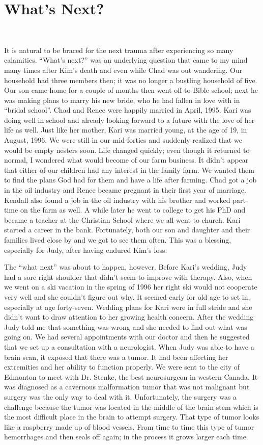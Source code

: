 \documentclass[oneside]{book}
\begin{document}
\section{What's Next?}
\

It is natural to be braced for the next trauma after experiencing so many calamities. “What’s next?” was an underlying question that came to my mind many times after Kim's death and even while Chad was out wandering. Our household had three members then; it was no longer a bustling household of five. Our son came home for a couple of months then went off to Bible school; next he was making plans to marry his new bride, who he had fallen in love with in “bridal school”. Chad and Renee were happily married in April, 1995. Kari was doing well in school and already looking forward to a future with the love of her life as well. Just like her mother, Kari was married young, at the age of 19, in August, 1996. We were still in our mid-forties and suddenly realized that we would be empty nesters soon. Life changed quickly; even though it returned to normal, I wondered what would become of our farm business. It didn't appear that either of our children had any interest in the family farm. We wanted them to find the plans God had for them and have a life after farming. Chad got a job in the oil industry and Renee became pregnant in their first year of marriage. Kendall also found a job in the oil industry with his brother and worked part-time on the farm as well. A while later he went to college to get his PhD and became a teacher at the Christian School where we all went to church. Kari started a career in the bank. Fortunately, both our son and daughter and their families lived close by and we got to see them often. This was a blessing, especially for Judy, after having endured Kim’s loss.

The “what next” was about to happen, however. Before Kari's wedding, Judy had a sore right shoulder that didn't seem to improve with therapy. Also, when we went on a ski vacation in the spring of 1996 her right ski would not cooperate very well and she couldn't figure out why. It  seemed early for old age to set in, especially at age forty-seven. Wedding plans for Kari were in full stride and she didn't want to draw attention to her growing health concern. After the wedding Judy told me that something was wrong and she needed to find out what was going on. We had several appointments with our doctor and then he suggested that we set up a consultation with a neurologist. When Judy was able to have a brain scan, it exposed that there was a tumor. It had been affecting her extremities and her ability to function properly. We were sent to the city of Edmonton to meet with Dr. Stenke, the best neurosurgeon in western Canada. It was diagnosed as a cavernous malformation tumor that was not malignant but surgery was the only way to deal with it. Unfortunately, the surgery was a challenge because the tumor was located in the middle of the brain stem which is the most difficult place in the brain to attempt surgery. That type of tumor looks like a raspberry made up of blood vessels. From time to time this type of tumor hemorrhages and then seals off again; in the process it grows larger each time.
\end{document}
